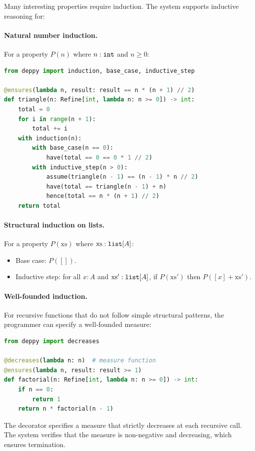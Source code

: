 \documentclass[11pt]{report}
\DeclareRobustCommand{\py}[1]{\texttt{\detokenize{#1}}}
\theoremstyle{definition}
\theoremstyle{plain}
\begin{document}
Many interesting properties require induction. The system supports inductive
reasoning for:

\paragraph{Natural number induction.}
For a property $P(n)$ where $n : \py{int}$ and $n \geq 0$:
\begin{lstlisting}[style=deppy,language=Python]
from deppy import induction, base_case, inductive_step

@ensures(lambda n, result: result == n * (n + 1) // 2)
def triangle(n: Refine[int, lambda n: n >= 0]) -> int:
    total = 0
    for i in range(n + 1):
        total += i
    with induction(n):
        with base_case(n == 0):
            have(total == 0 == 0 * 1 // 2)
        with inductive_step(n > 0):
            assume(triangle(n - 1) == (n - 1) * n // 2)
            have(total == triangle(n - 1) + n)
            hence(total == n * (n + 1) // 2)
    return total
\end{lstlisting}

\paragraph{Structural induction on lists.}
For a property $P(\mathrm{xs})$ where $\mathrm{xs} : \py{list}[A]$:
\begin{itemize}[nosep]
  \item Base case: $P([])$.
  \item Inductive step: for all $x : A$ and $\mathrm{xs'} : \py{list}[A]$,
        if $P(\mathrm{xs'})$ then $P([x] + \mathrm{xs'})$.
\end{itemize}

\paragraph{Well-founded induction.}
For recursive functions that do not follow simple structural patterns, the
programmer can specify a well-founded measure:
\begin{lstlisting}[style=deppy,language=Python]
from deppy import decreases

@decreases(lambda n: n)  # measure function
@ensures(lambda n, result: result >= 1)
def factorial(n: Refine[int, lambda n: n >= 0]) -> int:
    if n == 0:
        return 1
    return n * factorial(n - 1)
\end{lstlisting}

The \py{@decreases} decorator specifies a measure that strictly decreases at
each recursive call. The system verifies that the measure is non-negative and
decreasing, which ensures termination.
\end{document}
